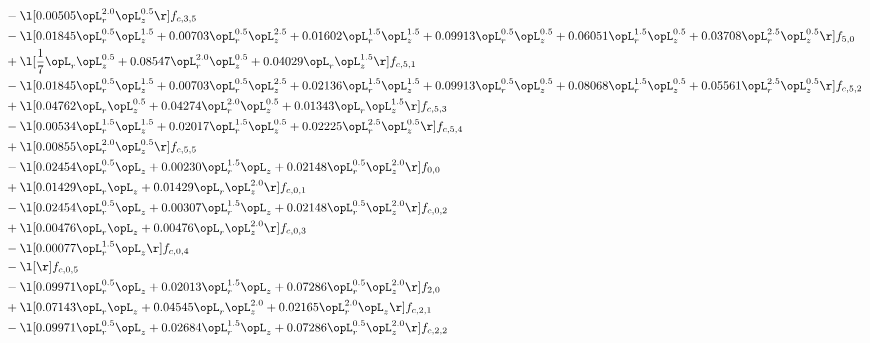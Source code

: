 \begin{alignat}{2}
& - \l[  0.00505 \opL_r^{2.0} \opL_z^{0.5}  \r] f_{c,3,5} \nonumber \\ 
& - \l[  0.01845 \opL_r^{0.5} \opL_z^{1.5} +  0.00703 \opL_r^{0.5} \opL_z^{2.5} +  0.01602 \opL_r^{1.5} \opL_z^{1.5} +  0.09913 \opL_r^{0.5} \opL_z^{0.5} +  0.06051 \opL_r^{1.5} \opL_z^{0.5} +  0.03708 \opL_r^{2.5} \opL_z^{0.5}  \r] f_{5,0} \nonumber \\ 
& + \l[ \frac{1}{7} \opL_r \opL_z^{0.5} +  0.08547 \opL_r^{2.0} \opL_z^{0.5} +  0.04029 \opL_r \opL_z^{1.5}  \r] f_{c,5,1} \nonumber \\ 
& - \l[  0.01845 \opL_r^{0.5} \opL_z^{1.5} +  0.00703 \opL_r^{0.5} \opL_z^{2.5} +  0.02136 \opL_r^{1.5} \opL_z^{1.5} +  0.09913 \opL_r^{0.5} \opL_z^{0.5} +  0.08068 \opL_r^{1.5} \opL_z^{0.5} +  0.05561 \opL_r^{2.5} \opL_z^{0.5}  \r] f_{c,5,2} \nonumber \\ 
& + \l[  0.04762 \opL_r \opL_z^{0.5} +  0.04274 \opL_r^{2.0} \opL_z^{0.5} +  0.01343 \opL_r \opL_z^{1.5}  \r] f_{c,5,3} \nonumber \\ 
& - \l[  0.00534 \opL_r^{1.5} \opL_z^{1.5} +  0.02017 \opL_r^{1.5} \opL_z^{0.5} +  0.02225 \opL_r^{2.5} \opL_z^{0.5}  \r] f_{c,5,4} \nonumber \\ 
& + \l[  0.00855 \opL_r^{2.0} \opL_z^{0.5}  \r] f_{c,5,5} \nonumber \\ 
& - \l[  0.02454 \opL_r^{0.5} \opL_z +  0.00230 \opL_r^{1.5} \opL_z +  0.02148 \opL_r^{0.5} \opL_z^{2.0}  \r] f_{0,0} \nonumber \\ 
& + \l[  0.01429 \opL_r \opL_z +  0.01429 \opL_r \opL_z^{2.0}  \r] f_{c,0,1} \nonumber \\ 
& - \l[  0.02454 \opL_r^{0.5} \opL_z +  0.00307 \opL_r^{1.5} \opL_z +  0.02148 \opL_r^{0.5} \opL_z^{2.0}  \r] f_{c,0,2} \nonumber \\ 
& + \l[  0.00476 \opL_r \opL_z +  0.00476 \opL_r \opL_z^{2.0}  \r] f_{c,0,3} \nonumber \\ 
& - \l[  0.00077 \opL_r^{1.5} \opL_z  \r] f_{c,0,4} \nonumber \\ 
& - \l[  \r] f_{c,0,5} \nonumber \\ 
& - \l[  0.09971 \opL_r^{0.5} \opL_z +  0.02013 \opL_r^{1.5} \opL_z +  0.07286 \opL_r^{0.5} \opL_z^{2.0}  \r] f_{2,0} \nonumber \\ 
& + \l[  0.07143 \opL_r \opL_z +  0.04545 \opL_r \opL_z^{2.0} +  0.02165 \opL_r^{2.0} \opL_z  \r] f_{c,2,1} \nonumber \\ 
& - \l[  0.09971 \opL_r^{0.5} \opL_z +  0.02684 \opL_r^{1.5} \opL_z +  0.07286 \opL_r^{0.5} \opL_z^{2.0}  \r] f_{c,2,2} \nonumber \\ 

\end{alignat}
